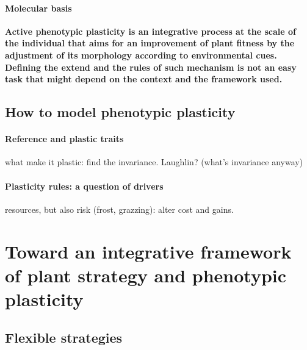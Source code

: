 \paragraph{Molecular basis}

\textbf{Active phenotypic plasticity is an integrative process at the scale of the individual that aims for an improvement of plant fitness by the adjustment of its morphology according to environmental cues. Defining the extend and the rules of such mechanism is not an easy task that might depend on the context and the framework used.}

\subsection{How to model phenotypic plasticity}

\paragraph{Reference and plastic traits}

what make it plastic: find the invariance. Laughlin? (what's invariance anyway)

\paragraph{Plasticity rules: a question of drivers}

resources, but also risk (frost, grazzing): alter cost and gains.





\textbf{}

\section{Toward an integrative framework of plant strategy and phenotypic plasticity}


\subsection{Flexible strategies}

